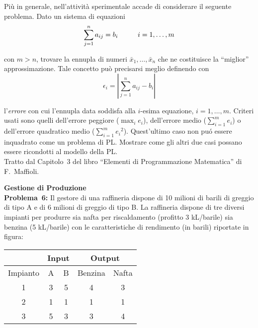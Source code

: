 \documentclass[11pt]{article}
\begin{document}
Pi\`u in generale,
nell'attivit\`a sperimentale
accade di considerare il seguente problema.
Dato un sistema di equazioni
\[
   \sum_{j=1}^n a_{ij} = b_i \mbox{\hspace{1cm}} i = 1, \ldots, m
\]

con $m > n$,
trovare la ennupla di numeri $\bar{x}_1, \ldots, \bar{x}_n$
che ne costituisce la ``miglior'' approssimazione.
Tale concetto pu\`o precisarsi meglio definendo con
\[
   \epsilon_i = \left| \sum_{j=1}^n a_{ij} - b_i\right|
\]
 
l'{\em errore} con cui l'ennupla data soddisfa
alla $i$-esima equazione, $i = 1, \ldots, m$.
Criteri usati sono quelli dell'errore peggiore ($\max_i e_i$),
dell'errore medio ($\sum_{i=1}^m e_i$)
o dell'errore quadratico medio ($\sum_{i=1}^m {e_i}^2$).
Quest'ultimo caso non pu\'o essere inquadrato come un
problema di PL.
Mostrare come gli altri due casi possano
essere ricondotti al modello della PL.\\


Tratto dal Capitolo~3
del libro ``Elementi di Programmazione Matematica'' 
di F.~Maffioli.\\

\bigskip

{\large \bf Gestione di Produzione}\\

{\sc \bf Problema~6\/:}
Il gestore di una raffineria dispone di 10 milioni
di barili di greggio di tipo A
e di 6 milioni di greggio di tipo B.
La raffineria dispone di tre diversi impianti
per produrre sia nafta per riscaldamento (profitto 3 kL/barile)
sia benzina (5 kL/barile)
con le caratteristiche di rendimento (in barili)
riportate in figura:

\begin{table}[!htb]
\begin{tabular}{|c|c|c|c|c|} \hline
   & \multicolumn{2}{|c|}{Input} & \multicolumn{2}{|c|}{Output} \\
\hline
   Impianto & A & B & Benzina & Nafta \\
\hline
   1 & 3 & 5 & 4 & 3 \\
   2 & 1 & 1 & 1 & 1 \\ 
   3 & 5 & 3 & 3 & 4 \\ 
\hline

\end{tabular}
\end{table}
\end{document}
